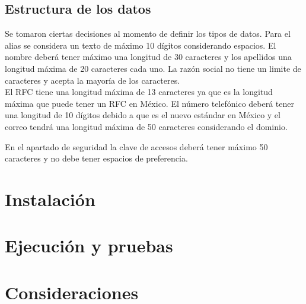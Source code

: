 \documentclass[12pt]{article}
\begin{document}
		\subsection{Estructura de los datos}
			Se tomaron ciertas decisiones al momento de definir los tipos de datos. Para el alias se considera un texto de máximo 10 dígitos considerando espacios. El nombre deberá tener máximo una longitud de 30 caracteres y los apellidos una longitud máxima de 20 caracteres cada uno. La razón social no tiene un limite de caracteres y acepta la mayoría de los caracteres.
			\\
			El RFC tiene una longitud máxima de 13 caracteres ya que es la longitud máxima que puede tener un RFC en México. El número telefónico deberá tener una longitud de 10 dígitos debido a que es el nuevo estándar en México y el correo tendrá una longitud máxima de 50 caracteres considerando el dominio.
			
			En el apartado de seguridad la clave de accesos deberá tener máximo 50 caracteres y no debe tener espacios de preferencia.
					
			
	\newpage	
	\section{Instalación}
	
	\section{Ejecución y pruebas}
	
	\section{Consideraciones}
\end{document}
